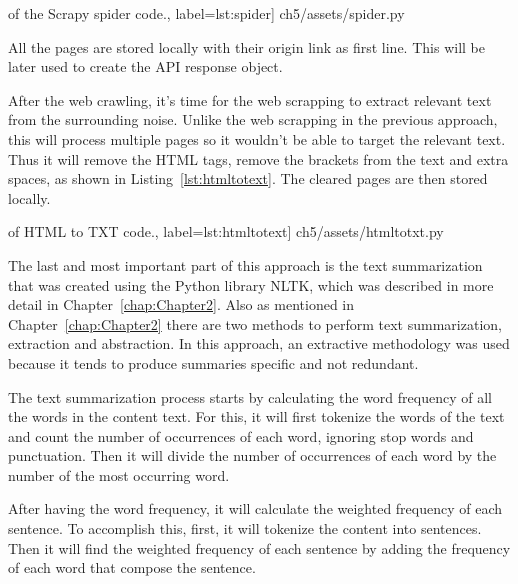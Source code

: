 \begin{center}
\begin{minipage}{0.95\linewidth}
 of the Scrapy spider code.,
label=lst:spider]
{ch5/assets/spider.py}
\end{minipage}
\end{center}

All the pages are stored locally with their origin link as first line.
This will be later used to create the API response object.

After the web crawling, it's time for the web scrapping to extract relevant text from the surrounding noise.
Unlike the web scrapping in the previous approach, this will process multiple pages so it wouldn't be able to target the relevant text.
Thus it will remove the HTML tags, remove the brackets from the text and extra spaces, as shown in Listing~\ref{lst:htmltotext}.
The cleared pages are then stored locally.

\begin{center}
\begin{minipage}{0.95\linewidth}
 of HTML to TXT code.,
label=lst:htmltotext]
{ch5/assets/htmltotxt.py}
\end{minipage}
\end{center}

The last and most important part of this approach is the text summarization that was created using the Python library NLTK, which was described in more detail in Chapter~\ref{chap:Chapter2}.
Also as mentioned in Chapter~\ref{chap:Chapter2} there are two methods to perform text summarization, extraction and abstraction.
In this approach, an extractive methodology was used because it tends to produce summaries specific and not redundant\cite{cheung2008comparing}.

The text summarization process starts by calculating the word frequency of all the words in the content text.
For this, it will first tokenize the words of the text and count the number of occurrences of each word, ignoring stop words and punctuation.
Then it will divide the number of occurrences of each word by the number of the most occurring word.

After having the word frequency, it will calculate the weighted frequency of each sentence.
To accomplish this, first, it will tokenize the content into sentences.
Then it will find the weighted frequency of each sentence by adding the frequency of each word that compose the sentence.

